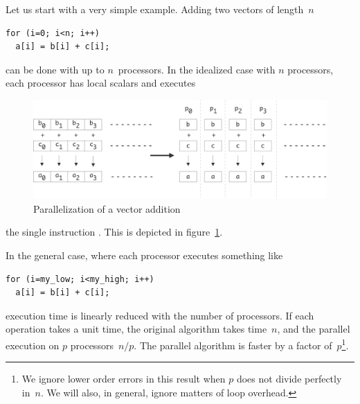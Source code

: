 Let us start with a very simple example. Adding two vectors of length~$n$
\begin{verbatim}
for (i=0; i<n; i++)
  a[i] = b[i] + c[i];
\end{verbatim}
can be done with up to $n$~processors. In the idealized case with $n$
processors, each processor has local scalars  and executes
\begin{figure}[ht]
  \includegraphics[scale=.11]{graphics/parallel-add}
  \caption{Parallelization of a vector addition}
  \label{fig:par-add}
\end{figure}
the single instruction . This is depicted in
figure~\ref{fig:par-add}.

In the general case, where each processor executes something like
\begin{verbatim}
for (i=my_low; i<my_high; i++)
  a[i] = b[i] + c[i];
\end{verbatim}
execution time is linearly
reduced with the number of processors. If each operation takes a unit
time, the original algorithm takes time~$n$, and the parallel
execution on $p$ processors~$n/p$. The parallel algorithm is faster by
a factor of~$p$\footnote{We ignore lower order errors in this result
  when $p$ does not divide perfectly in~$n$. We will also, in general,
ignore matters of loop overhead.}.

